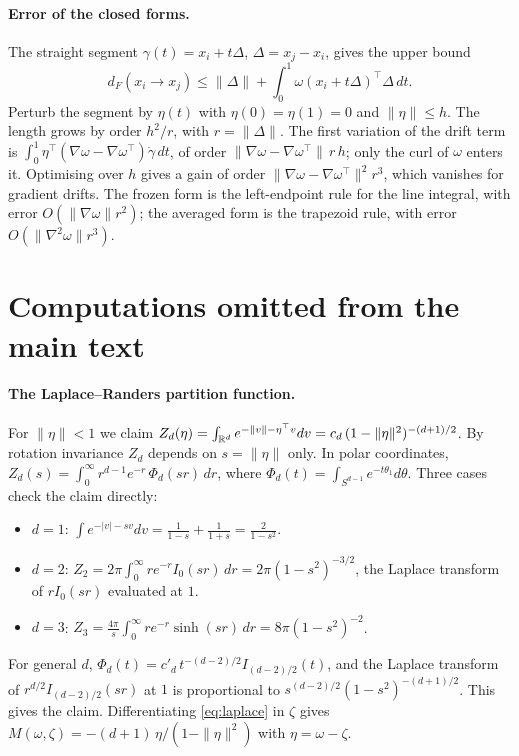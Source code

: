 \paragraph{Error of the closed forms.}
The straight segment $\gamma(t)=x_i+t\Delta$, $\Delta=x_j-x_i$, gives the
upper bound
\[
  d_F(x_i\to x_j)\le\|\Delta\|+\int_0^1\omega(x_i+t\Delta)^\top\Delta\,dt .
\]
Perturb the segment by $\eta(t)$ with $\eta(0)=\eta(1)=0$ and
$\|\eta\|\le h$. The length grows by order $h^2/r$, with $r=\|\Delta\|$.
The first variation of the drift term is
$\int_0^1\eta^\top(\nabla\omega-\nabla\omega^\top)\dot\gamma\,dt$, of
order $\|\nabla\omega-\nabla\omega^\top\|\,r\,h$; only the curl of
$\omega$ enters it. Optimising over $h$ gives a gain of order
$\|\nabla\omega-\nabla\omega^\top\|^2r^3$, which vanishes for gradient
drifts. The frozen form is the left-endpoint rule for the line integral,
with error $O(\|\nabla\omega\|r^2)$; the averaged form is the trapezoid
rule, with error $O(\|\nabla^2\omega\|r^3)$.

\section{Computations omitted from the main text}
\label{app:computations}

\paragraph{The Laplace--Randers partition function.}
For $\|\eta\|<1$ we claim $Z_d(\eta)=\int_{\mathbb{R}^d}e^{-\|v\|-\eta^\top v}dv=c_d\,(1-\|\eta\|^2)^{-(d+1)/2}$.
By rotation invariance $Z_d$ depends on $s=\|\eta\|$ only. In polar
coordinates, $Z_d(s)=\int_0^\infty r^{d-1}e^{-r}\,\Phi_d(sr)\,dr$, where
$\Phi_d(t)=\int_{S^{d-1}}e^{-t\theta_1}d\theta$. Three cases check the
claim directly:
\begin{itemize}
  \item $d=1$: $\int e^{-|v|-sv}dv=\frac{1}{1-s}+\frac{1}{1+s}=\frac{2}{1-s^2}$.
  \item $d=2$: $Z_2=2\pi\int_0^\infty re^{-r}I_0(sr)\,dr=2\pi(1-s^2)^{-3/2}$,
    the Laplace transform of $rI_0(sr)$ evaluated at $1$.
  \item $d=3$: $Z_3=\frac{4\pi}{s}\int_0^\infty re^{-r}\sinh(sr)\,dr=8\pi(1-s^2)^{-2}$.
\end{itemize}
For general $d$, $\Phi_d(t)=c'_d\,t^{-(d-2)/2}I_{(d-2)/2}(t)$, and the
Laplace transform of $r^{d/2}I_{(d-2)/2}(sr)$ at $1$ is proportional to
$s^{(d-2)/2}(1-s^2)^{-(d+1)/2}$. This gives the claim.
Differentiating \eqref{eq:laplace} in $\zeta$ gives
$M(\omega,\zeta)=-(d+1)\,\eta/(1-\|\eta\|^2)$ with $\eta=\omega-\zeta$.

